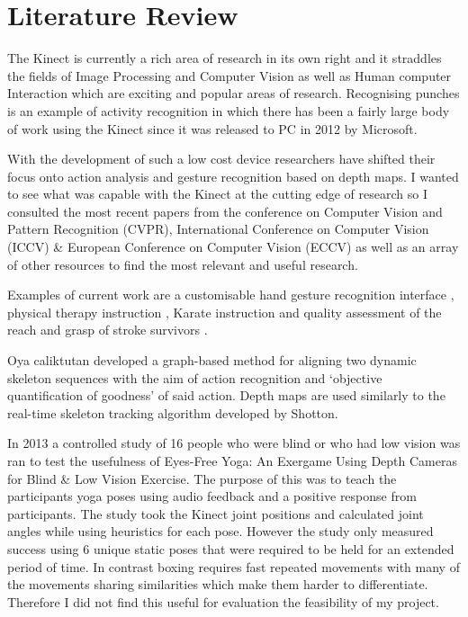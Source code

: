 \section{Literature Review}
The Kinect is currently a rich area of research in its own right and it straddles the fields of Image Processing and Computer Vision as well as Human computer Interaction which are exciting and popular areas of research. Recognising punches is an example of activity recognition in which there has been a fairly large body of work using the Kinect since it was released to PC in 2012 by Microsoft.

With the development of such a low cost device researchers have shifted their focus onto action analysis and gesture recognition based on depth maps. I wanted to see what was capable with the Kinect at the cutting edge of research so I consulted the most recent papers from the conference on Computer Vision and Pattern Recognition (CVPR), International Conference on Computer Vision (ICCV) \& European Conference on Computer Vision (ECCV) as well as an array of other resources to find the most relevant and useful research. 

Examples of current work are a customisable hand gesture recognition interface \cite{chr}, physical therapy instruction \cite{physio}\cite{Kinect2012}, Karate instruction \cite{karate} and quality assessment of the reach and grasp of stroke survivors \cite{rehab}.

Oya caliktutan developed a graph-based method for aligning two dynamic skeleton sequences with the aim of action recognition and `objective quantification of goodness' of said action. \cite{Celiktutan2013a} Depth maps are used similarly to the real-time skeleton tracking algorithm developed by Shotton. \cite{Shotton2011}


In 2013 a controlled study of 16 people who were blind or who had low vision was ran to test the usefulness of Eyes-Free Yoga: An Exergame Using Depth Cameras for Blind \& Low Vision Exercise. The purpose of this was to teach the participants yoga poses using audio feedback and a positive response from participants.\cite{Rector2013} The study took the Kinect joint positions and calculated joint angles while using heuristics for each pose. However the study only measured success using 6 unique static poses that were required to be held for an extended period of time. In contrast boxing requires fast repeated movements with many of the movements sharing similarities which make them harder to differentiate. Therefore I did not find this useful for evaluation the feasibility of my project.


